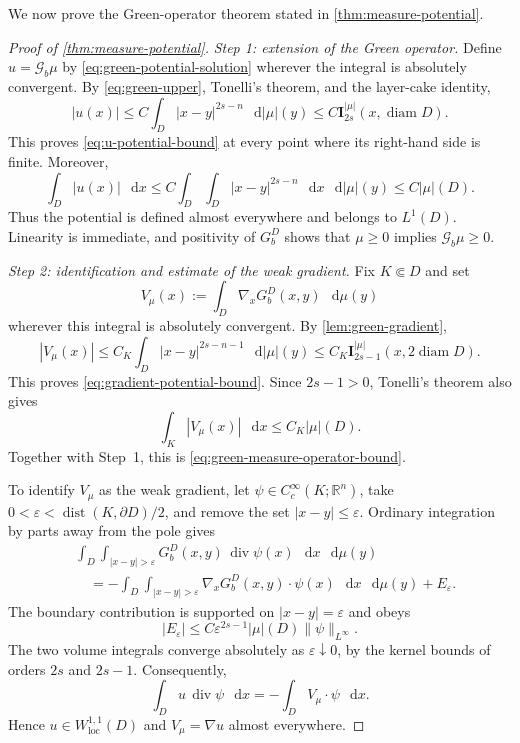 \documentclass[reqno]{amsart}
\numberwithin{equation}{section}
\theoremstyle{plain}
\theoremstyle{definition}
\theoremstyle{remark}
\newcommand{\R}{\mathbb R}
\newcommand{\I}{\mathbf I}
\newcommand{\differential}{\mathop{}\!\mathrm d}
\DeclareMathOperator{\divergence}{div}
\newcommand{\rev}[1]{#1}
\begin{document}
\rev{We now prove the Green-operator theorem stated in
\cref{thm:measure-potential}.}

\begin{proof}[Proof of \cref{thm:measure-potential}]
\begingroup
\emph{Step 1: extension of the Green operator.}
Define $u=\mathcal G_b\mu$ by \eqref{eq:green-potential-solution} wherever
the integral is absolutely convergent.  By \eqref{eq:green-upper}, Tonelli's
theorem, and the layer-cake identity,
\[
 |u(x)|\le C\int_D|x-y|^{2s-n}\,\differential|\mu|(y)
 \le C\I_{2s}^{|\mu|}(x,\operatorname{diam}D).
\]
This proves \eqref{eq:u-potential-bound} at every point where its right-hand
side is finite.  Moreover,
\[
 \int_D|u(x)|\,\differential x
 \le C\int_D\int_D|x-y|^{2s-n}\,\differential x\,
       \differential|\mu|(y)
 \le C|\mu|(D).
\]
Thus the potential is defined almost everywhere and belongs to $L^1(D)$.
Linearity is immediate, and positivity of $G_b^D$ shows that
$\mu\ge0$ implies $\mathcal G_b\mu\ge0$.

\emph{Step 2: identification and estimate of the weak gradient.}
Fix $K\Subset D$ and set
\[
 V_\mu(x):=\int_D\nabla_xG_b^D(x,y)\,\differential\mu(y)
\]
wherever this integral is absolutely convergent.  By
\cref{lem:green-gradient},
\[
 |V_\mu(x)|
 \le C_K\int_D|x-y|^{2s-n-1}\,\differential|\mu|(y)
 \le C_K\I_{2s-1}^{|\mu|}(x,2\operatorname{diam}D).
\]
This proves \eqref{eq:gradient-potential-bound}.  Since $2s-1>0$, Tonelli's
theorem also gives
\[
 \int_K|V_\mu(x)|\,\differential x\le C_K|\mu|(D).
\]
Together with Step~1, this is \eqref{eq:green-measure-operator-bound}.

To identify $V_\mu$ as the weak gradient, let
$\psi\in C_c^\infty(K;\R^n)$, take
$0<\varepsilon<\operatorname{dist}(K,\partial D)/2$, and remove the set
$|x-y|\le\varepsilon$.  Ordinary integration by parts away from the pole
gives
\begin{align*}
 &\int_D\int_{|x-y|>\varepsilon}
 G_b^D(x,y)\,\divergence\psi(x)
 \,\differential x\,\differential\mu(y)\\
 &\quad=-\int_D\int_{|x-y|>\varepsilon}
 \nabla_xG_b^D(x,y)\cdot\psi(x)
 \,\differential x\,\differential\mu(y)+E_\varepsilon.
\end{align*}
The boundary contribution is supported on $|x-y|=\varepsilon$ and obeys
\[
 |E_\varepsilon|
 \le C\varepsilon^{2s-1}|\mu|(D)\|\psi\|_{L^\infty}.
\]
The two volume integrals converge absolutely as
$\varepsilon\downarrow0$, by the kernel bounds of orders $2s$ and $2s-1$.
Consequently,
\[
 \int_Du\,\divergence\psi\,\differential x
 =-\int_DV_\mu\cdot\psi\,\differential x.
\]
Hence $u\in W^{1,1}_{\mathrm{loc}}(D)$ and
$V_\mu=\nabla u$ almost everywhere.


\end{proof}
\end{document}
